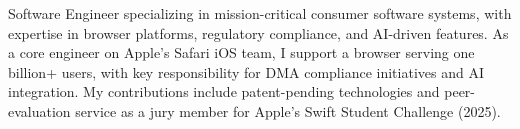 

\begin{cvparagraph}

Software Engineer specializing in mission-critical consumer software systems, with expertise in browser platforms, regulatory compliance, and AI-driven features. As a core engineer on Apple’s Safari iOS team, I support a browser serving one billion+ users, with key responsibility for DMA compliance initiatives and AI integration. My contributions include patent-pending technologies and peer-evaluation service as a jury member for Apple’s Swift Student Challenge (2025).
\end{cvparagraph}
